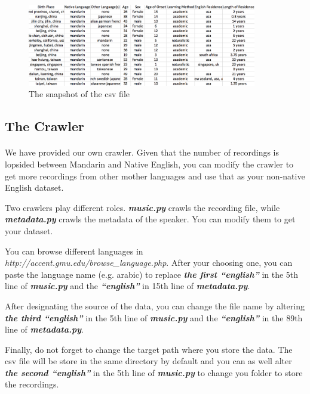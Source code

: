 \begin{figure}[ht]
\begin{center}
\includegraphics[width=10cm]{csv.png}
\end{center}
\caption{The snapshot of the csv file}
\end{figure}


\subsection{The Crawler}
\paragraph{}
We have provided our own crawler. Given that the number of recordings is lopsided between Mandarin and Native English, you can modify the crawler to get more recordings from other mother languages and use that as your non-native English dataset.

Two crawlers play different roles. \textbf{\emph{music.py}} crawls the recording file, while \textbf{\emph{metadata.py}} crawls the metadata of the speaker. You can modify them to get your dataset.

You can browse different languages in \emph{http://accent.gmu.edu/browse\_language.php}. After your choosing one, you can paste the language name (e.g. arabic) to replace \textbf{\emph{the first ``english''}} in the 5th line of \textbf{\emph{music.py}} and the \textbf{\emph{``english''}} in 15th line of \textbf{\emph{metadata.py}}.

After designating the source of the data, you can change the file name by altering \textbf{\emph{the third ``english''}} in the 5th line of \textbf{\emph{music.py}} and the \textbf{\emph{``english''}} in the 89th line of \textbf{\emph{metadata.py}}.

Finally, do not forget to change the target path where you store the data. The csv file will be store in the same directory by default and you can as well alter \textbf{\emph{the second ``english''}} in the 5th line of \textbf{\emph{music.py}} to change you folder to store the recordings.

